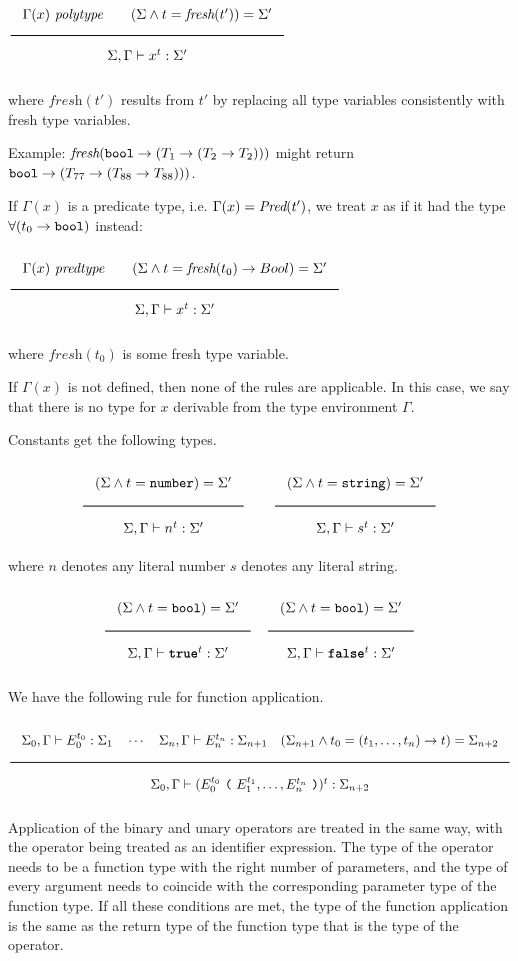 \noindent
$\Rule{\Gamma(x)\ \polytype \qquad
  (\Sigma \wedge t = \textit{fresh}(t')) = \Sigma'}{\Sigma, \Gamma \vdash x^t : \Sigma'}$

\noindent
where $\textit{fresh}(t')$ results from $t'$ by replacing all type variables consistently with
fresh type variables.

Example: $\textit{fresh}(\texttt{bool} \rightarrow (T_1 \rightarrow (T_2 \rightarrow T_2)))$
might return $\texttt{bool} \rightarrow (T_{77} \rightarrow (T_{88} \rightarrow T_{88})))$.

If $\Gamma(x)$ is a predicate type,  i.e. $\Gamma(x) = \textit{Pred}(t')$,
we treat $x$ as if it had the type $\forall (t_0 \rightarrow \texttt{bool})$ instead:

\noindent
$\Rule{\Gamma(x)\ \predtype \qquad
  (\Sigma \wedge t = \textit{fresh}(t_0) \rightarrow Bool) = \Sigma'}{\Sigma, \Gamma \vdash x^t : \Sigma'}$

\noindent
where $\textit{fresh}(t_0)$ is some fresh type variable.

If $\Gamma(x)$ is not defined, then none of the rules are applicable.
In this case, we say that
there is no type for $x$ derivable from the type environment $\Gamma$. 

Constants get the following types.

\noindent
\[
  \Rule{(\Sigma \wedge t = \Number) = \Sigma'}{\Sigma, \Gamma \vdash n^t : \Sigma'}
  \qquad
  \Rule{(\Sigma \wedge t = \String) = \Sigma'}{\Sigma, \Gamma \vdash s^t : \Sigma'}
\]
\noindent
where $n$ denotes any literal number $s$ denotes any literal string.

\noindent
\[
  \Rule{(\Sigma \wedge t = \Bool) = \Sigma'}{\Sigma, \Gamma \vdash \TruE^t : \Sigma'}
  \quad
  \Rule{(\Sigma \wedge t = \Bool) = \Sigma'}{\Sigma, \Gamma \vdash \FalsE^t : \Sigma'}  
\]

We have the following rule for function application.

\[
\Rule{  \Sigma_0, \Gamma \vdash E_0^{t_0} : \Sigma_1 \quad
  \cdots \quad \Sigma_{n}, \Gamma \vdash E_{n}^{t_n} : \Sigma_{n+1} \quad
  (\Sigma_{n+1} \wedge t_0 = (t_1, \ldots, t_n) \rightarrow t) = \Sigma_{n+2}}{
  \Sigma_0, \Gamma \vdash (E_0^{t_0}\ \Lp \ E_1^{t_1}, \ldots, E_n^{t_n}\ \Rp)^t : \Sigma_{n+2}}  
\]

\noindent
Application of the binary and unary operators are treated in the same way, with the operator
being treated as an identifier expression.
The type of the operator needs to be a function type with the right
number of parameters, and the type of every argument needs to coincide
with the corresponding parameter type of the function type. If all these
conditions are met, the type of the function application is the same
as the return type of the function type that is the type of the operator.

